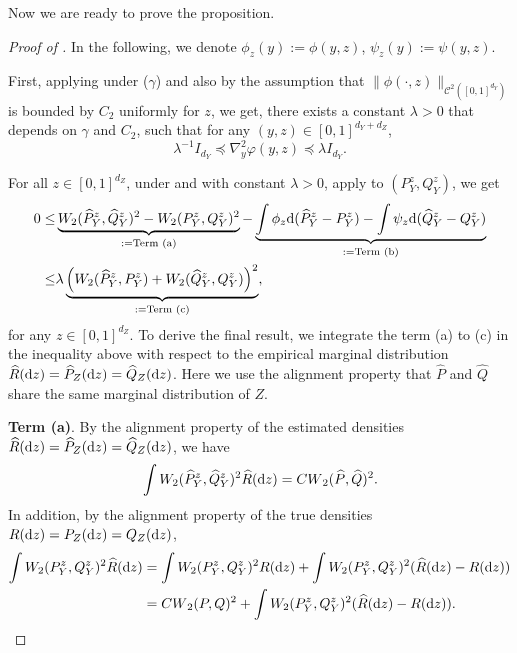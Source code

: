 \documentclass{article}
\theoremstyle{plain}
\theoremstyle{definition}
\def\PP{P}
\def\QQ{Q}
\def\calC{\mathcal{C}}
\theoremstyle{plain}
\newcommand{\diff}{{\rm d}}
\def\calC{\mathcal{C}}
\newcommand{\Cwass}{{CW}}
\begin{document}
Now we are ready to prove the proposition.
\begin{proof}[Proof of ]\label{proof:prop:stability.COT}
In the following, we denote $\phi_z(y):= \phi(y,z) $, $\psi_z(y):= \psi(y,z) $. 

First, applying  under  ($\gamma$) and also by the assumption that $\|\phi(\cdot, z)\|_{\calC^2([0,1]^{d_Y})}$ is bounded by $C_2$ uniformly for $z$, we get, there exists a constant $\lambda > 0$ that depends on $\gamma$ and $C_2$, such that for any $(y, z) \in [0,1]^{d_Y + d_Z}$,
\[
    \lambda^{-1}I_{d_Y} \preceq \nabla^2_y \varphi(y,z) \preceq  \lambda I_{d_Y}.
\]

For all $z\in [0,1]^{d_Z}$, under  and   with constant $\lambda > 0$, apply  to $(\PP_Y^z, \QQ_Y^z)$, we get
\begin{align*}    
    0 \leq &\underbrace{W_2(\widehat \PP_Y^{z},\widehat \QQ_Y^{z})^2 - W_2(\PP_Y^z,\QQ_Y^z)^2}_{:=\text{Term (a)}}- \underbrace{\int \phi_z \diff (\widehat \PP_Y^{z} - \PP_Y^z) - \int \psi_z \diff (\widehat \QQ_Y^{z} - \QQ_Y^z)}_{:=\text{Term (b)}} \\
    \leq& \lambda \underbrace{\left(W_2(\widehat \PP_Y^{z}, P_Y^z) + W_2(\widehat \QQ_Y^{z}, \QQ_Y^z)\right)^2}_{:=\text{Term (c)}},
\end{align*}
for any $z \in [0,1]^{d_Z}$.
To derive the final result, we integrate the term (a) to (c) in the inequality above with respect to the empirical marginal distribution $\widehat R(\diff z) = \widehat{\PP}_Z(\diff z) = \widehat{\QQ}_Z(\diff z)$. 
Here we use the alignment property that $\widehat \PP$ and $\widehat \QQ$ share the same
marginal distribution of $Z$.


\textbf{Term (a)}. By the alignment property of the estimated densities $\widehat R(\diff z) = \widehat{\PP}_Z(\diff z) = \widehat{\QQ}_Z(\diff z)$, we have 
    \[
        \int W_2(\widehat \PP_Y^{z},\widehat \QQ_Y^{z})^2  \widehat R(\diff z) = \Cwass_{2}(\widehat \PP, \widehat \QQ)^2.
    \]
    In addition, by the alignment property of the true densities $R(\diff z) = {\PP}_Z(\diff z) = {\QQ}_Z(\diff z)$, 
    \begin{align}\label{eq:proof:stability.COT.1}
    \begin{split}
       \int W_2(\PP_Y^z,\QQ_Y^z)^2  \widehat R(\diff z)  &= \int W_2(\PP_Y^z,\QQ_Y^z)^2  R(\diff z) + \int W_2(\PP_Y^z,\QQ_Y^z)^2  (\widehat R(\diff z) - R(\diff z))\\
        &= \Cwass_2(\PP, \QQ)^2 + \int W_2(\PP_Y^z,\QQ_Y^z)^2  (\widehat R(\diff z) - R(\diff z)).
    \end{split}
    \end{align}


\end{proof}
\end{document}
